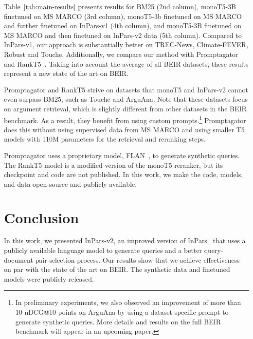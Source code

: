 \documentclass{article}
\begin{document}
Table~\ref{tab:main-results} presents results for BM25 (2nd column), monoT5-3B finetuned on MS MARCO (3rd column), monoT5-3b finetuned on MS MARCO and further finetuned on InPars-v1 (4th column), and monoT5-3B finetuned on MS MARCO and then finetuned on InPars-v2 data (5th column). Compared to InPars-v1, our approach is substantially better on TREC-News, Climate-FEVER, Robust and Touche. Additionally, we compare our method with Promptagator~\cite{dai2022promptagator} and RankT5~\cite{zhuang2022rankt5}. Taking into account the average of all BEIR datasets, these results represent a new state of the art on BEIR.

Promptagator and RankT5 strive on datasets that monoT5 and InPars-v2 cannot even surpass BM25, such as Touche and ArguAna. Note that these datasets focus on argument retrieval, which is slightly different from other datasets in the BEIR benchmark. As a result, they benefit from using custom prompts.\footnote{In preliminary experiments, we also observed an improvement of more than 10 nDCG@10 points on ArguAna by using a dataset-specific prompt to generate synthetic queries. More details and results on the full BEIR benchmark will appear in an upcoming paper.} Promptagator does this without using supervised data from MS MARCO and using smaller T5 models with 110M parameters for the retrieval and reranking steps.

Promptagator uses a proprietary model, FLAN~\cite{wei2021finetuned}, to generate synthetic queries. The RankT5 model is a modified version of the monoT5 reranker, but its checkpoint and code are not published. In this work, we make the code, models, and data open-source and publicly available. %





\section{Conclusion}

In this work, we presented InPars-v2, an improved version of InPars~\cite{bonifacio2022inpars} that uses a publicly available language model to generate queries and a better query-document pair selection process. Our results show that we achieve effectiveness on par with the state of the art on BEIR. The synthetic data and finetuned models were publicly released.
\end{document}
